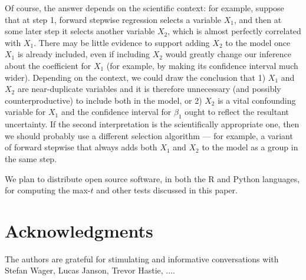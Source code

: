 \documentclass{article}
\begin{document}
Of course, the answer depends on the scientific context: for example, suppose that at step 1, forward stepwise regression selects a variable $X_1$, and then at some later step it selects another variable $X_2$, which is almost perfectly correlated with $X_1$. There may be little evidence to support adding $X_2$ to the model once $X_1$ is already included, even if including $X_2$ would greatly change our inference about the coefficient for $X_1$ (for example, by making its confidence interval much wider). Depending on the context, we could draw the conclusion that 1) $X_1$ and $X_2$ are near-duplicate variables and it is therefore unnecessary (and possibly counterproductive) to include both in the model, or 2) $X_2$ is a vital confounding variable for $X_1$ and the confidence interval for $\beta_1$ ought to reflect the resultant uncertainty. If the second interpretation is the scientifically appropriate one, then we should probably use a different selection algorithm --- for example, a variant of forward stepwise that always adds both $X_1$ and $X_2$ to the model as a group in the same step.

We plan to distribute  open source software, in both the R and Python languages,  for computing the max-$t$ and other tests discussed in this paper.


\section*{Acknowledgments}

The authors are grateful for stimulating and informative conversations with Stefan Wager, Lucas Janson, Trevor Hastie, ....



\end{document}
